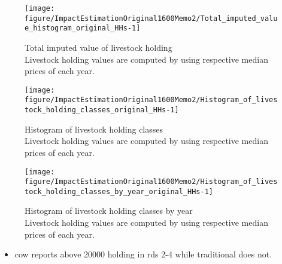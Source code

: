 \begin{Schunk}
\begin{figure}

{\centering \texttt{[image: figure/ImpactEstimationOriginal1600Memo2/Total\_imputed\_value\_histogram\_original\_HHs-1]} 

}

\caption{Total imputed value of livestock holding\\ {\footnotesize Livestock holding values are computed by using respective median prices of each year.\setlength{\baselineskip}{8pt}}}\label{Figure Total imputed value histogram original HHs}
\end{figure}
\end{Schunk}
\begin{Schunk}
\begin{figure}

{\centering \texttt{[image: figure/ImpactEstimationOriginal1600Memo2/Histogram\_of\_livestock\_holding\_classes\_original\_HHs-1]} 

}

\caption{Histogram of livestock holding classes\\ {\footnotesize Livestock holding values are computed by using respective median prices of each year.\setlength{\baselineskip}{8pt}}}\label{Figure Histogram of livestock holding classes original HHs}
\end{figure}
\end{Schunk}
\begin{Schunk}
\begin{figure}

{\centering \texttt{[image: figure/ImpactEstimationOriginal1600Memo2/Histogram\_of\_livestock\_holding\_classes\_by\_year\_original\_HHs-1]} 

}

\caption{Histogram of livestock holding classes by year\\ {\footnotesize Livestock holding values are computed by using respective median prices of each year.\setlength{\baselineskip}{8pt}}}\label{Figure Histogram of livestock holding classes by year original HHs}
\end{figure}
\end{Schunk}
\begin{itemize}
\vspace{1.0ex}\setlength{\itemsep}{1.0ex}\setlength{\baselineskip}{12pt}
\item	\textsf{cow} reports above 20000 holding in rds 2-4 while \textsf{traditional} does not.
\end{itemize}
